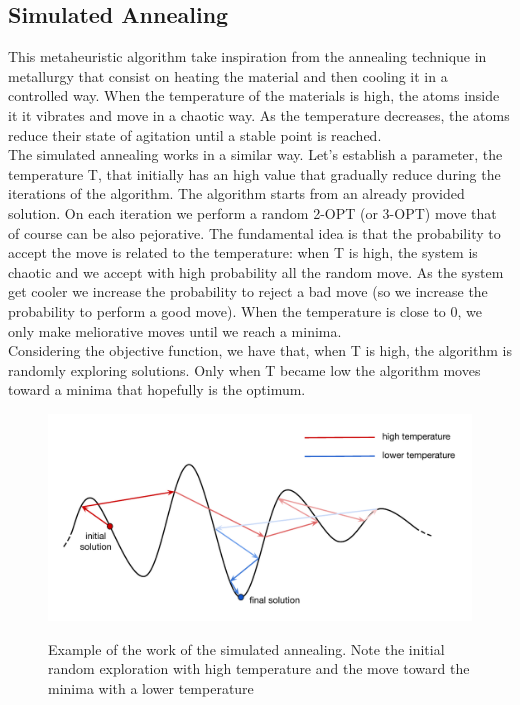 \subsection{Simulated Annealing}
This metaheuristic algorithm take inspiration from the annealing technique in metallurgy that consist on heating the material and then cooling it in a controlled way. When the temperature of the materials is high, the atoms inside it it vibrates and move in a chaotic way. As the temperature decreases, the atoms reduce their state of agitation until a stable point is reached. \\
The simulated annealing works in a similar way. Let's establish a parameter, the temperature T, that initially has an high value that gradually reduce during the iterations of the algorithm. The algorithm starts from an already provided solution. On each iteration we perform a random 2-OPT (or 3-OPT) move that of course can be also pejorative. The fundamental idea is that the probability to accept the move is related to the temperature: when T is high, the system is chaotic and we accept with high probability all the random move. As the system get cooler we increase the probability to reject a bad move (so we increase the probability to perform a good move). When the temperature is close to 0, we only make meliorative moves until we reach a minima.\\
Considering the objective function, we have that, when T is high, the algorithm is randomly exploring solutions. Only when T became low the algorithm moves toward a minima that hopefully is the optimum.

\begin{figure}[h!]
\centering
	\includegraphics[scale=0.77]{media/sim_annealing.pdf} \\
	\caption{Example of the work of the simulated annealing. Note the initial random exploration with high temperature and the move toward the minima with a lower temperature}
\end{figure}

